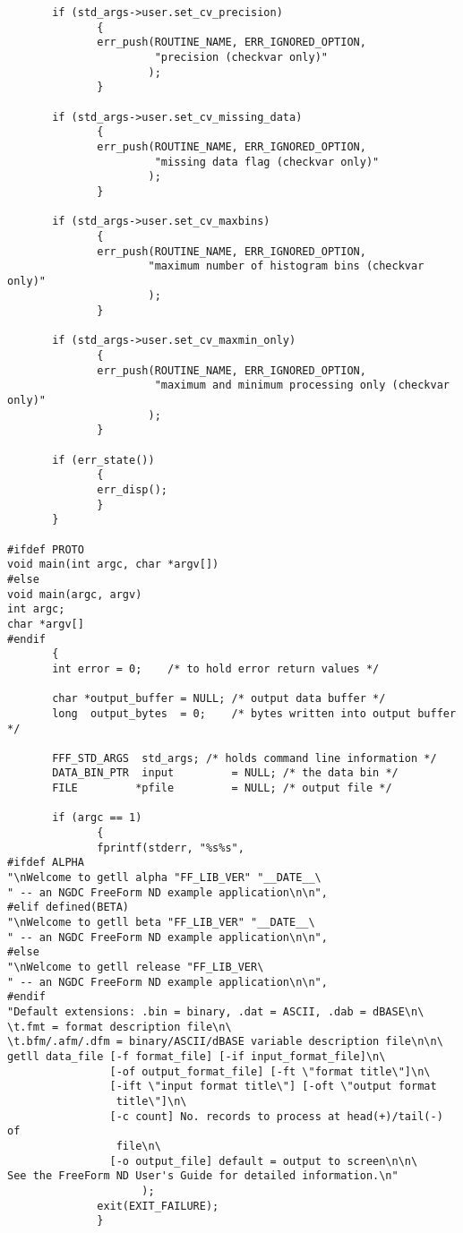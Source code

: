 \begin{verbatim}
       if (std_args->user.set_cv_precision)
              {
              err_push(ROUTINE_NAME, ERR_IGNORED_OPTION,
                       "precision (checkvar only)"
                      );
              }
       
       if (std_args->user.set_cv_missing_data)
              {                                        
              err_push(ROUTINE_NAME, ERR_IGNORED_OPTION,
                       "missing data flag (checkvar only)"
                      );
              }
       
       if (std_args->user.set_cv_maxbins)
              {
              err_push(ROUTINE_NAME, ERR_IGNORED_OPTION,
                      "maximum number of histogram bins (checkvar only)"
                      );
              }
       
       if (std_args->user.set_cv_maxmin_only)
              {
              err_push(ROUTINE_NAME, ERR_IGNORED_OPTION,
                       "maximum and minimum processing only (checkvar only)"
                      );
              }
       
       if (err_state())
              {
              err_disp();
              }
       }

#ifdef PROTO
void main(int argc, char *argv[])
#else
void main(argc, argv)
int argc;
char *argv[]
#endif
       {
       int error = 0;    /* to hold error return values */

       char *output_buffer = NULL; /* output data buffer */
       long  output_bytes  = 0;    /* bytes written into output buffer */

       FFF_STD_ARGS  std_args; /* holds command line information */
       DATA_BIN_PTR  input         = NULL; /* the data bin */
       FILE         *pfile         = NULL; /* output file */
            
       if (argc == 1)
              {
              fprintf(stderr, "%s%s",
#ifdef ALPHA
"\nWelcome to getll alpha "FF_LIB_VER" "__DATE__\
" -- an NGDC FreeForm ND example application\n\n",
#elif defined(BETA)
"\nWelcome to getll beta "FF_LIB_VER" "__DATE__\
" -- an NGDC FreeForm ND example application\n\n",
#else
"\nWelcome to getll release "FF_LIB_VER\
" -- an NGDC FreeForm ND example application\n\n",
#endif
"Default extensions: .bin = binary, .dat = ASCII, .dab = dBASE\n\
\t.fmt = format description file\n\
\t.bfm/.afm/.dfm = binary/ASCII/dBASE variable description file\n\n\
getll data_file [-f format_file] [-if input_format_file]\n\
                [-of output_format_file] [-ft \"format title\"]\n\
                [-ift \"input format title\"] [-oft \"output format 
                 title\"]\n\
                [-c count] No. records to process at head(+)/tail(-) of 
                 file\n\
                [-o output_file] default = output to screen\n\n\
See the FreeForm ND User's Guide for detailed information.\n"
                     );
              exit(EXIT_FAILURE);
              }
     

\end{verbatim}
